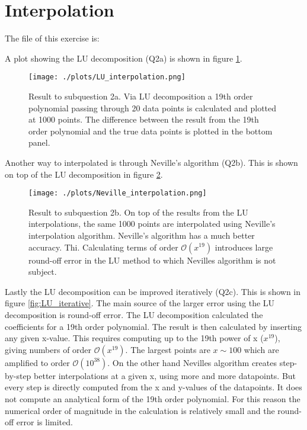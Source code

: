 \section{Interpolation}

The file of this exercise is:



A plot showing the LU decomposition (Q2a) is shown in figure \ref{fig:LU}.

\begin{figure}[h!]
  \centering
  \texttt{[image: ./plots/LU\_interpolation.png]}
  \caption{Result to subquestion 2a. Via LU decomposition a 19th order polynomial passing through 20 data points is calculated and plotted at 1000 points. The difference between the result from the 19th order polynomial and the true data points is plotted in the bottom panel.}
  \label{fig:LU}
\end{figure}

Another way to interpolated is through Neville's algorithm (Q2b). This is shown on top of the LU decomposition in figure \ref{fig:Neville}.

\begin{figure}[h!]
  \centering
  \texttt{[image: ./plots/Neville\_interpolation.png]}
  \caption{Result to subquestion 2b. On top of the results from the LU interpolations, the same 1000 points are interpolated using Neville's interpolation algorithm. Neville's algorithm has a much better accuracy. Thi. Calculating terms of order $\mathcal{O}(x^{19})$ introduces large round-off error in the LU method to which Nevilles algorithm is not subject.}
  \label{fig:Neville}
\end{figure}

Lastly the LU decomposition can be improved iteratively (Q2c). This is shown in figure \ref{fig:LU_iterative}. The main source of the larger error using the LU decomposition is round-off error. The LU decomposition calculated the coefficients for a 19th order polynomial. The result is then calculated by inserting any given x-value. This requires computing up to the 19th power of x ($x^{19}$), giving numbers of order $\mathcal{O}(x^{19})$. The largest points are $x\sim100$ which are amplified to order $\mathcal{O}(10^{38})$. On the other hand Nevilles algorithm creates step-by-step better interpolations at a given x, using more and more datapoints. But every step is directly computed from the x and y-values of the datapoints. It does not compute an analytical form of the 19th order polynomial. For this reason the numerical order of magnitude in the calculation is relatively small and the round-off error is limited.

